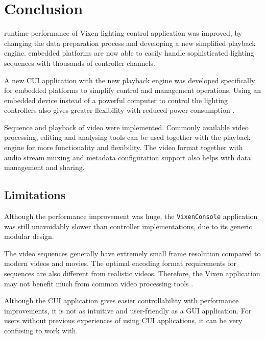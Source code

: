 \chapter{Conclusion}
\renewcommand{\baselinestretch}{\mystretch}
\label{chap:Conclusion}

 runtime performance of Vixen lighting control application was  improved, by changing the data preparation process and developing a new simplified playback engine.  embedded platforms are now able to easily handle sophisticated lighting sequences with thousands of controller channels.

A new CUI application with the new playback engine was developed specifically for embedded platforms to simplify control and management operations. Using an embedded device instead of a powerful computer to control the lighting controllers also gives greater flexibility with reduced power consumption .

Sequence  and playback of video  were implemented. Commonly available video processing, editing and analysing tools can be used together with the playback engine for more functionality and flexibility. The video format together with audio stream muxing and metadata configuration support also helps with data management and sharing.

\section{Limitations}

Although the performance improvement was huge, the \texttt{VixenConsole} application was still unavoidably slower than controller  implementations, due to its generic modular design.

The video sequences generally have extremely small frame resolution compared to modern videos and movies. The optimal encoding format requirements for sequences are also different from realistic videos. Therefore, the Vixen application may not benefit much from common video  processing tools .

Although the CUI application gives easier controllability with performance improvements, it is not as intuitive and user-friendly as a GUI application. For users without previous experiences of using CUI applications, it can be very confusing to work with.

